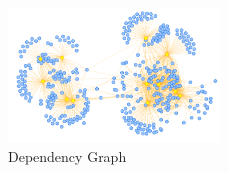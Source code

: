 \begin{figure}
  \centering
    \includegraphics[width=0.5\textwidth]{media/network.png}
    \caption{Dependency Graph\label{fig:dep-graph}}
\end{figure}